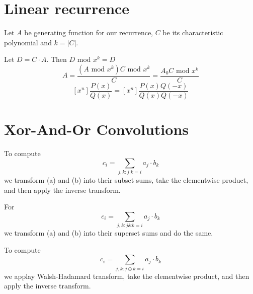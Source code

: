 \section{Linear recurrence}
Let $A$ be generating function for our recurrence, $C$ be its characteristic polynomial and $k = |C|$.

Let $D = C \cdot A$. Then $D \text{ mod } x^k = D$
$$A = \frac{(A \text{ mod } x^k) C \text{ mod } x^k}{C} = \frac{A_0C \text{ mod } x^k}{C}$$
$$[x^n]\frac{P(x)}{Q(x)} = [x^n]\frac{P(x)Q(-x)}{Q(x)Q(-x)}$$

\section{Xor-And-Or Convolutions}
To compute
$$c_i = \sum_{j, k : j | k = i} a_j \cdot b_k$$
we transform (a) and (b) into their subset sums, take the elementwise product, and then apply the inverse transform.

For
$$c_i = \sum_{j, k : j \& k = i} a_j \cdot b_k$$
we transform (a) and (b) into their superset sums and do the same.

To compute
$$c_i = \sum_{j, k : j \oplus k = i} a_j \cdot b_k$$
we applay Walsh-Hadamard transform, take the elementwise product, and then apply the inverse transform.
